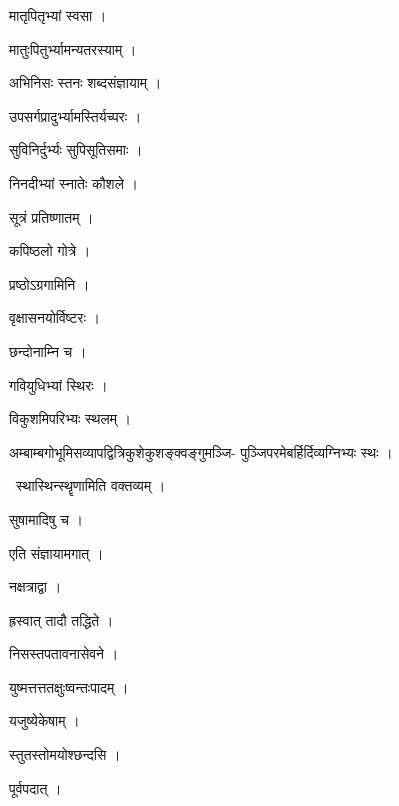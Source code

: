 \documentclass[10pt, openany, oneside]{book}
\begin{document}
\noindent मातृपितृभ्यां स्वसा ।

\noindent मातुःपितुर्भ्यामन्यतरस्याम् ।

\noindent अभिनिसः स्तनः शब्दसंज्ञायाम् ।

\noindent उपसर्गप्रादुर्भ्यामस्तिर्यच्परः ।

\noindent सुविनिर्दुर्भ्यः सुपिसूतिसमाः ।

\noindent निनदीभ्यां स्नातेः कौशले ।

\noindent सूत्रं प्रतिष्णातम् ।

\noindent कपिष्ठलो गोत्रे ।

\noindent प्रष्ठोऽग्रगामिनि ।

\noindent वृक्षासनयोर्विष्टरः ।

\noindent छन्दोनाम्नि च ।

\noindent गवियुधिभ्यां स्थिरः ।

\noindent विकुशमिपरिभ्यः स्थलम् ।

\noindent अम्बाम्बगोभूमिसव्यापद्वित्रिकुशेकुशङ्क्वङ्गुमञ्जि- पुञ्जिपरमेबर्हिर्दिव्यग्निभ्यः स्थः ।

\par\noindent\hspace{1.5em}{\vps वा॰}~{\qt स्थास्थिन्स्थॄणामिति वक्तव्यम् ।}

\noindent सुषामादिषु च ।

\noindent एति संज्ञायामगात् ।

\noindent नक्षत्राद्वा ।

\noindent ह्रस्वात् तादौ तद्धिते ।

\noindent निसस्तपतावनासेवने ।

\noindent युष्मत्तत्ततक्षुःष्वन्तःपादम् ।

\noindent यजुष्येकेषाम् ।

\noindent स्तुतस्तोमयोश्छन्दसि ।

\noindent पूर्वपदात् ।
\end{document}

